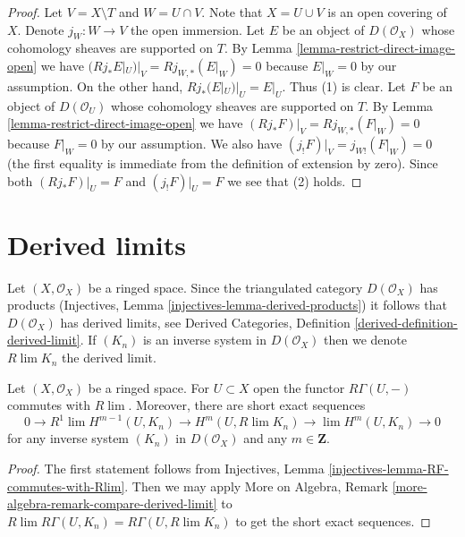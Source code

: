 \begin{proof}
Let $V = X \setminus T$ and $W = U \cap V$. Note that $X = U \cup V$ is an
open covering of $X$. Denote $j_W : W \to V$ the open immersion.
Let $E$ be an object of $D(\mathcal{O}_X)$ whose cohomology sheaves are
supported on $T$. By
Lemma \ref{lemma-restrict-direct-image-open} we have
$(Rj_*E|_U)|_V = Rj_{W, *}(E|_W) = 0$ because $E|_W = 0$ by our assumption.
On the other hand, $Rj_*(E|_U)|_U = E|_U$. Thus (1) is clear.
Let $F$ be an object of $D(\mathcal{O}_U)$ whose cohomology sheaves
are supported on $T$. By
Lemma \ref{lemma-restrict-direct-image-open} we have
$(Rj_*F)|_V = Rj_{W, *}(F|_W) = 0$ because $F|_W = 0$ by our assumption.
We also have $(j_!F)|_V = j_{W!}(F|_W) = 0$ (the first equality is immediate
from the definition of extension by zero). Since both
$(Rj_*F)|_U = F$ and $(j_!F)|_U = F$ we see that (2) holds.
\end{proof}







\section{Derived limits}
\label{section-derived-limits}

\noindent
Let $(X, \mathcal{O}_X)$ be a ringed space. Since the triangulated category
$D(\mathcal{O}_X)$ has products
(Injectives, Lemma \ref{injectives-lemma-derived-products})
it follows that $D(\mathcal{O}_X)$ has derived limits, see
Derived Categories, Definition \ref{derived-definition-derived-limit}.
If $(K_n)$ is an inverse system in $D(\mathcal{O}_X)$ then we
denote $R\lim K_n$ the derived limit.

\begin{lemma}
\label{lemma-RGamma-commutes-with-Rlim}
Let $(X, \mathcal{O}_X)$ be a ringed space. For $U \subset X$ open the
functor $R\Gamma(U, -)$ commutes with $R\lim$. Moreover, there are
short exact sequences
$$
0 \to
R^1\lim H^{m - 1}(U, K_n) \to H^m(U, R\lim K_n) \to
\lim H^m(U, K_n) \to 0
$$
for any inverse system $(K_n)$ in $D(\mathcal{O}_X)$ and any $m \in \mathbf{Z}$.
\end{lemma}

\begin{proof}
The first statement follows from
Injectives, Lemma \ref{injectives-lemma-RF-commutes-with-Rlim}.
Then we may apply 
More on Algebra, Remark \ref{more-algebra-remark-compare-derived-limit}
to $R\lim R\Gamma(U, K_n) = R\Gamma(U, R\lim K_n)$ to get the short
exact sequences.
\end{proof}

